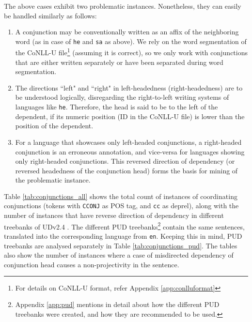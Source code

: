 The above cases exhibit two problematic instances. Nonetheless, they can easily be handled similarly as follows:

\begin{enumerate}
\item A conjunction may be conventionally written as an affix of the neighboring word (as in case of \verb|he| and \verb|sa| as above). We rely on the word segmentation of the CoNLL-U file\footnote{For details on CoNLL-U format, refer Appendix \ref{app:conlluformat}} (assuming it is correct), so we only work with conjunctions that are either written separately or have been separated during word segmentation.

\item The directions ``left" and ``right" in left-headedness (right-headedness) are to be understood logically, disregarding the right-to-left writing systems of languages like \verb|he|. Therefore, the head is said to be to the left of the dependent, if its numeric position (ID in the CoNLL-U file) is lower than the position of the dependent. 

\item For a language that showcases only left-headed conjunctions, a right-headed conjunction is an erroneous annotation, and vice-versa for languages showing only right-headed conjunctions. This reversed direction of dependency (or reversed headedness of the conjunction head) forms the basis for mining of the problematic instance.
\end{enumerate}

Table \ref{tab:conjunctions_all} shows the total count of instances of coordinating conjunctions (tokens with \verb|CCONJ| as POS tag, and \verb|cc| as deprel), along with the number of instances that have reverse direction of dependency in different treebanks of UDv2.4 \citep{UDv2.4}. The different PUD treebanks\footnote{Appendix \ref{app:pud} mentions in detail about how the different PUD treebanks were created, and how they are recommended to be used.} contain the same sentences, translated into the corresponding language from \verb|en|. Keeping this in mind, PUD treebanks are analysed separately in Table \ref{tab:conjunctions_pud}. The tables also show the number of instances where a case of misdirected dependency of conjunction head causes a non-projectivity in the sentence.

